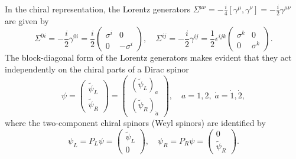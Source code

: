In the chiral representation, the Lorentz generators \(\Sigma^{\mu \nu} = -\tfrac{i}{4} [\gamma^\mu, \gamma^\nu] = -\tfrac{i}{2} \gamma^{\mu \nu}\) are given by
\[
    \Sigma^{0i} = - \frac{i}{2} \gamma^{0i} = \frac{i}{2} \begin{pmatrix}
        \sigma^i & 0          \\
        0        & - \sigma^i
    \end{pmatrix}, \quad \Sigma^{ij} = -\frac{i}{2}\gamma^{ij} = \frac{1}{2}\epsilon^{ijk} \begin{pmatrix}
        \sigma^k & 0        \\
        0        & \sigma^k
    \end{pmatrix}.
\]
The block-diagonal form of the Lorentz generators makes evident that they act independently on the chiral parts of a Dirac spinor
\[
    \psi = \begin{pmatrix}
        \tilde{\psi}_L \\
        \tilde{\psi}_R
    \end{pmatrix} = \begin{pmatrix}
        (\tilde{\psi}_L)_a \\
        (\tilde{\psi}_R)_{\dot{a}}
    \end{pmatrix}, \quad a = 1,2, \; \dot{a} = \dot{1}, \dot{2},
\]
where the two-component chiral spinors (Weyl spinors) are identified by
\[
    \psi_L = P_L \psi = \begin{pmatrix}
        \tilde{\psi}_L \\
        0
    \end{pmatrix}, \quad \psi_R = P_R \psi = \begin{pmatrix}
        0 \\
        \tilde{\psi}_R
    \end{pmatrix}.
\]

